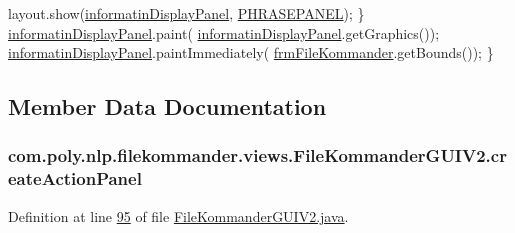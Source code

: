\begin{DoxyCode}
            layout.show(\hyperlink{classcom_1_1poly_1_1nlp_1_1filekommander_1_1views_1_1_file_kommander_g_u_i_v2_ac0e47bc8b5d4f38b43baae6b72778c1f}{informatinDisplayPanel}, 
      \hyperlink{classcom_1_1poly_1_1nlp_1_1filekommander_1_1views_1_1_file_kommander_g_u_i_v2_a29f098a62188676f40458619c9a3e81b}{PHRASEPANEL});
        \}
        \hyperlink{classcom_1_1poly_1_1nlp_1_1filekommander_1_1views_1_1_file_kommander_g_u_i_v2_ac0e47bc8b5d4f38b43baae6b72778c1f}{informatinDisplayPanel}.paint(
      \hyperlink{classcom_1_1poly_1_1nlp_1_1filekommander_1_1views_1_1_file_kommander_g_u_i_v2_ac0e47bc8b5d4f38b43baae6b72778c1f}{informatinDisplayPanel}.getGraphics());
        \hyperlink{classcom_1_1poly_1_1nlp_1_1filekommander_1_1views_1_1_file_kommander_g_u_i_v2_ac0e47bc8b5d4f38b43baae6b72778c1f}{informatinDisplayPanel}.paintImmediately(
      \hyperlink{classcom_1_1poly_1_1nlp_1_1filekommander_1_1views_1_1_file_kommander_g_u_i_v2_a98fff3b4c6caac91d624b07beab03af5}{frmFileKommander}.getBounds());
    \}
\end{DoxyCode}


\subsection{Member Data Documentation}
\hypertarget{classcom_1_1poly_1_1nlp_1_1filekommander_1_1views_1_1_file_kommander_g_u_i_v2_a1838b8ff89c4457f8df1209e48f9e474}{
\subsubsection[{create\-Action\-Panel}]{ com.\-poly.\-nlp.\-filekommander.\-views.\-File\-Kommander\-G\-U\-I\-V2.\-create\-Action\-Panel\hspace{0.3cm}{\ttfamily [private]}}}\label{classcom_1_1poly_1_1nlp_1_1filekommander_1_1views_1_1_file_kommander_g_u_i_v2_a1838b8ff89c4457f8df1209e48f9e474}


Definition at line \hyperlink{L95}{95} of file \hyperlink{}{File\-Kommander\-G\-U\-I\-V2.\-java}.

